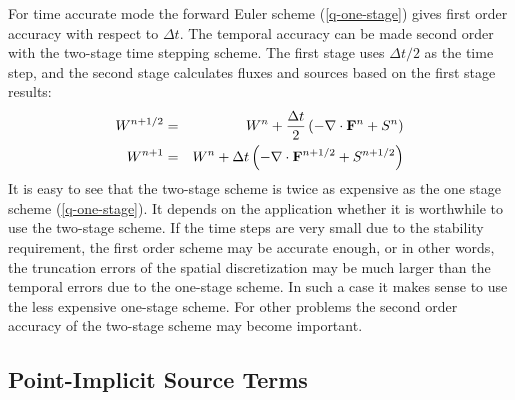 For time accurate mode the forward Euler scheme (\ref{q-one-stage})
gives first order accuracy with respect to $\Delta t$.
The temporal accuracy can be made second order
with the two-stage time stepping scheme. The first stage uses $\Delta t/2$
as the time step, and the second stage calculates fluxes and sources
based on the first stage results:
\begin{eqnarray}
W^{n+1/2}&=&W^n + \frac{\Delta t}{2}
               \left(-\nabla\cdot\mathbf F^n + S^n\right)  \nonumber \\
W^{n+1}&=&W^n + \Delta t
               \left(-\nabla\cdot\mathbf F^{n+1/2} + S^{n+1/2}\right)  
\label{q-two-stage}
\end{eqnarray}
It is easy to see that the two-stage scheme is twice as expensive as 
the one stage scheme (\ref{q-one-stage}). 
It depends on the application whether it is worthwhile to 
use the two-stage scheme. If the time steps
are very small due to the stability requirement, 
the first order scheme may be accurate enough, or
in other words, the truncation errors of the spatial discretization
may be much larger than the temporal errors due to the one-stage scheme.
In such a case it makes sense to use the less expensive one-stage scheme.
For other problems the second order accuracy of the two-stage scheme may 
become important.

\subsection{Point-Implicit Source Terms \label{section:point_implicit}}

